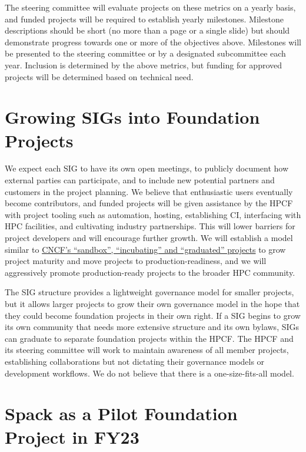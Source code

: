\documentclass[11pt]{article}
\begin{document}
The steering committee will evaluate projects on these metrics on a yearly basis, and
funded projects will be required to establish yearly milestones. Milestone descriptions
should be short (no more than a page or a single slide) but should demonstrate progress
towards one or more of the objectives above. Milestones will be presented to the
steering committee or by a designated subcommittee each year. Inclusion is determined by
the above metrics, but funding for approved projects will be determined based on
technical need.

\section{Growing SIGs into Foundation Projects}

We expect each SIG to have its own open meetings, to publicly document how external
parties can participate, and to include new potential partners and customers in the
project planning. We believe that enthusiastic users eventually become contributors, and
funded projects will be given assistance by the HPCF with project tooling such as
automation, hosting, establishing CI, interfacing with HPC facilities, and cultivating
industry partnerships. This will lower barriers for project developers and will
encourage further growth. We will establish a model similar to
\href{https://www.cncf.io/projects/}{CNCF's ``sandbox'', ``incubating'' and
  ``graduated'' projects} to grow project maturity and move projects to
production-readiness, and we will aggressively promote production-ready projects to the
broader HPC community.

The SIG structure provides a lightweight governance model for smaller projects, but it
allows larger projects to grow their own governance model in the hope that they could
become foundation projects in their own right. If a SIG begins to grow its own community
that needs more extensive structure and its own bylaws, SIGs can graduate to separate
foundation projects within the HPCF. The HPCF and its steering committee will work to
maintain awareness of all member projects, establishing collaborations but not dictating
their governance models or development workflows. We do not believe that there is a
one-size-fits-all model.

\section{Spack as a Pilot Foundation Project in FY23}
\end{document}
